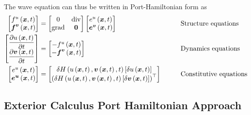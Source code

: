 The wave equation can thus be written in Port-Hamiltonian form as
\begin{equation}
  \begin{aligned}
    \begin{bmatrix}
       f^{u}\left(  \boldsymbol{x} ,t \right)  \\
        \boldsymbol{f} ^{ \boldsymbol{v} }\left(  \boldsymbol{x} ,t \right) 
    \end{bmatrix}&=\begin{bmatrix}
    0 & \operatorname{div} \\
    \operatorname{grad} &  \boldsymbol{0} 
    \end{bmatrix}\begin{bmatrix}
       e^{u}\left(  \boldsymbol{x} ,t \right)  \\
        \boldsymbol{e} ^{ \boldsymbol{v} }\left(  \boldsymbol{x} ,t \right) 
    \end{bmatrix}&\qquad&\text{Structure equations}\\
    \begin{bmatrix}
       \dfrac{\partial  u\left(  \boldsymbol{x} ,t \right) }{\partial t}  \\
       \dfrac{\partial   \boldsymbol{v} \left(  \boldsymbol{x} ,t \right) }{\partial t}       
    \end{bmatrix}&=\begin{bmatrix}
      - f^{u}\left(  \boldsymbol{x} ,{t} \right)  \\
      -  \boldsymbol{f} ^{ \boldsymbol{v} }\left(  \boldsymbol{x} ,{t} \right)  \\          
    \end{bmatrix}&\qquad&\text{Dynamics equations}\\
    \begin{bmatrix}
       e^{u}\left(  \boldsymbol{x} ,t \right) \\
        \boldsymbol{e} ^{ \boldsymbol{u} }\left(  \boldsymbol{x} ,t \right) \\
    \end{bmatrix}&=\begin{bmatrix}
       \delta     H \left(  u\left(  \boldsymbol{x} ,t \right) ,  \boldsymbol{v} \left(  \boldsymbol{x} ,t \right) ,t \right)  \left[   \delta   u\left(  \boldsymbol{x} ,t \right)   \right]  \\
     {\left(    \delta     H \left(  u\left(  \boldsymbol{x} ,t \right) ,  \boldsymbol{v} \left(  \boldsymbol{x} ,t \right) ,t \right)  \left[   \delta    \boldsymbol{v} \left(  \boldsymbol{x} ,t \right)   \right]   \right)}^{ \top } 
    \end{bmatrix}&\qquad&\text{Constitutive equations}
  \end{aligned}
\end{equation}

\subsection{Exterior Calculus Port Hamiltonian Approach}

